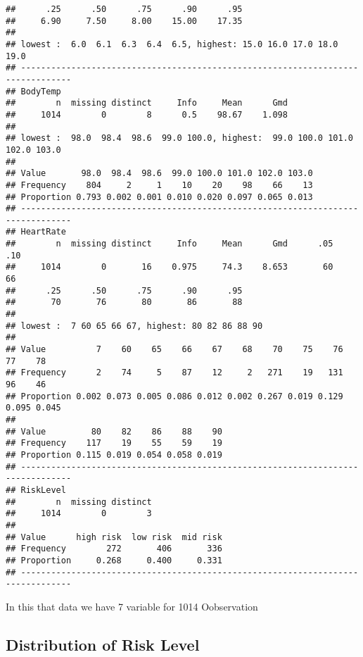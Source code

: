 \documentclass[
]{article}
\newenvironment{Shaded}{\begin{snugshade}}{\end{snugshade}}
\newcommand{\FunctionTok}[1]{\textcolor[rgb]{0.00,0.00,0.00}{#1}}
\newcommand{\NormalTok}[1]{#1}
\newcommand{\SpecialCharTok}[1]{\textcolor[rgb]{0.00,0.00,0.00}{#1}}
\begin{document}
\begin{verbatim}
##      .25      .50      .75      .90      .95 
##     6.90     7.50     8.00    15.00    17.35 
## 
## lowest :  6.0  6.1  6.3  6.4  6.5, highest: 15.0 16.0 17.0 18.0 19.0
## --------------------------------------------------------------------------------
## BodyTemp 
##        n  missing distinct     Info     Mean      Gmd 
##     1014        0        8      0.5    98.67    1.098 
## 
## lowest :  98.0  98.4  98.6  99.0 100.0, highest:  99.0 100.0 101.0 102.0 103.0
##                                                           
## Value       98.0  98.4  98.6  99.0 100.0 101.0 102.0 103.0
## Frequency    804     2     1    10    20    98    66    13
## Proportion 0.793 0.002 0.001 0.010 0.020 0.097 0.065 0.013
## --------------------------------------------------------------------------------
## HeartRate 
##        n  missing distinct     Info     Mean      Gmd      .05      .10 
##     1014        0       16    0.975     74.3    8.653       60       66 
##      .25      .50      .75      .90      .95 
##       70       76       80       86       88 
## 
## lowest :  7 60 65 66 67, highest: 80 82 86 88 90
##                                                                             
## Value          7    60    65    66    67    68    70    75    76    77    78
## Frequency      2    74     5    87    12     2   271    19   131    96    46
## Proportion 0.002 0.073 0.005 0.086 0.012 0.002 0.267 0.019 0.129 0.095 0.045
##                                         
## Value         80    82    86    88    90
## Frequency    117    19    55    59    19
## Proportion 0.115 0.019 0.054 0.058 0.019
## --------------------------------------------------------------------------------
## RiskLevel 
##        n  missing distinct 
##     1014        0        3 
##                                         
## Value      high risk  low risk  mid risk
## Frequency        272       406       336
## Proportion     0.268     0.400     0.331
## --------------------------------------------------------------------------------
\end{verbatim}

In this that data we have 7 variable for 1014 Oobservation

\hypertarget{distribution-of-risk-level}{%
\subsection{Distribution of Risk
Level}\label{distribution-of-risk-level}}

\begin{Shaded}
\end{Shaded}
\end{document}
